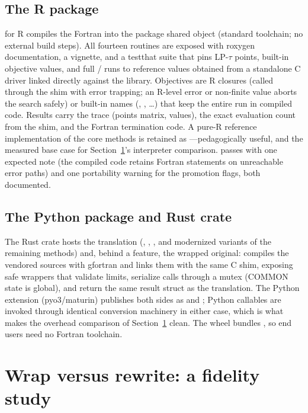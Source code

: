 \subsection{The R package}

 for R compiles the Fortran into the package shared
object (standard  toolchain; no external build steps). All
fourteen routines are exposed with roxygen documentation, a vignette,
and a testthat suite that pins LP-$\tau$ points, built-in objective
values, and full / runs to reference values
obtained from a standalone C driver linked directly against the library.
Objectives are R closures (called through the shim with error trapping;
an R-level error or non-finite value aborts the search safely) or
built-in names (, , \ldots) that keep the
entire run in compiled code. Results carry the trace (points matrix,
values), the exact evaluation count from the shim, and the Fortran
termination code. A pure-R reference implementation of the core methods
is retained as ---pedagogically useful, and
the measured base case for Section~\ref{sec:fidelity}'s interpreter
comparison.  passes with one expected note (the
compiled code retains Fortran  statements on unreachable
error paths) and one portability warning for the promotion flags,
both documented.

\subsection{The Python package and Rust crate}

The Rust crate hosts the translation (, ,
, and modernized variants of the remaining methods) and,
behind a  feature, the wrapped original: 
compiles the vendored sources with gfortran and links them with the same
C shim, exposing safe wrappers that validate limits, serialize calls
through a mutex (COMMON state is global), and return the same
result struct as the translation. The Python extension (pyo3/maturin)
publishes both sides as  and
; Python callables are invoked through identical
conversion machinery in either case, which is what makes the overhead
comparison of Section~\ref{sec:fidelity} clean. The wheel bundles
, so end users need no Fortran toolchain.

\section{Wrap versus rewrite: a fidelity study}
\label{sec:fidelity}

